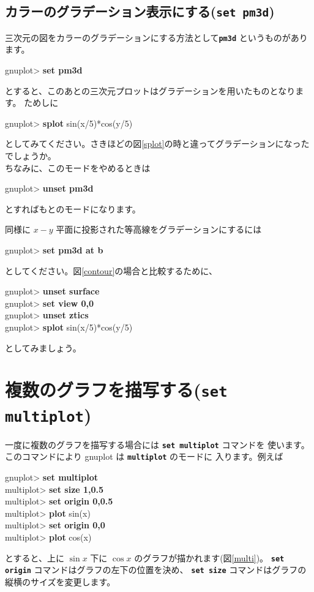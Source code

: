 \documentclass[a4j]{ujarticle} %
\newenvironment{terminal}{%
  \begin{center}
   \begin{minipage}{.8\textwidth}
    \setlength{\FrameSep}{.5\FrameSep}%
    \begin{framed}\ttfamily\small%
     \setlength\baselineskip{.85\baselineskip}%
}{%
    \end{framed}
   \end{minipage}
  \end{center}%
}
\begin{document}
\subsection{カラーのグラデーション表示にする({\tt\bf set pm3d})}
三次元の図をカラーのグラデーションにする方法として{\tt\bf pm3d} というものがあります。
\begin{terminal}
gnuplot> {\bf set pm3d}
\end{terminal}
とすると、このあとの三次元プロットはグラデーションを用いたものとなります。
ためしに
\begin{terminal}
gnuplot> {\bf splot} sin(x/5)*cos(y/5)
\end{terminal}
としてみてください。さきほどの図\ref{splot}の時と違ってグラデーションになったでしょうか。\\
ちなみに、このモードをやめるときは
\begin{terminal}
gnuplot> {\bf unset pm3d}
\end{terminal}
とすればもとのモードになります。

同様に $x-y$ 平面に投影された等高線をグラデーションにするには
\begin{terminal}
gnuplot> {\bf set pm3d at b}
\end{terminal}
としてください。図\ref{contour}の場合と比較するために、
\begin{terminal}
gnuplot> {\bf unset surface}\\
 gnuplot> {\bf set view 0,0} \\
 gnuplot> {\bf unset ztics} \\
 gnuplot> {\bf splot} sin(x/5)*cos(y/5)
\end{terminal}
としてみましょう。

\section{複数のグラフを描写する({\tt\bf set multiplot})}
一度に複数のグラフを描写する場合には {\tt\bf set multiplot} コマンドを
使います。このコマンドにより gnuplot は {\tt\bf multiplot} のモードに
入ります。例えば
\begin{terminal}
gnuplot> {\bf set multiplot} \\
multiplot> {\bf set size 1,0.5} \\
multiplot> {\bf set origin 0,0.5} \\
 multiplot> {\bf plot} sin(x) \\
 multiplot> {\bf set origin 0,0} \\
 multiplot> {\bf plot} cos(x)
\end{terminal}
とすると、上に $\sin x$ 下に $\cos x$ のグラフが描かれます(図\ref{multi})。
{\tt\bf set origin} コマンドはグラフの左下の位置を決め、
{\tt\bf set size} コマンドはグラフの縦横のサイズを変更します。
\end{document}
